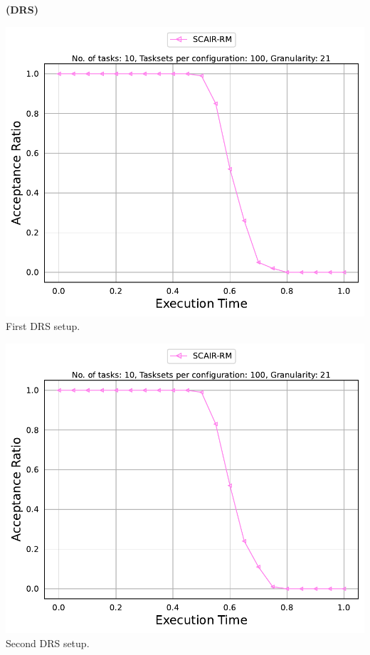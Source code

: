 \documentclass[]{article}
\begin{document}
	\begin{minipage}[t]{0.48\linewidth}
		\centering
		\textbf{(DRS)}
		\vspace{0.3cm}
		
		\includegraphics[width=\linewidth]{SCAIR-RM[21][0.01-0.1][10].pdf}
		First DRS setup.
		\vspace{0.3cm}
		
		\includegraphics[width=\linewidth]{SCAIR-RM_2nd.pdf}
		Second DRS setup.
		\vspace{0.3cm}


\end{minipage}
\end{document}

